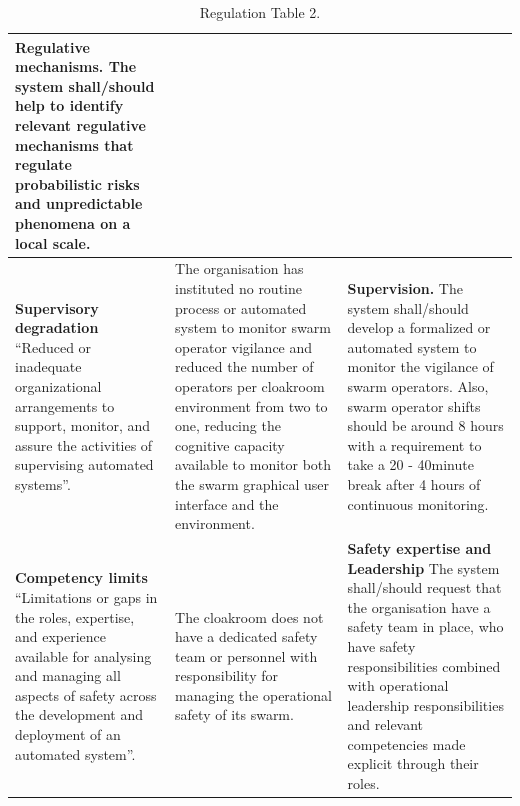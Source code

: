 \documentclass[lettersize,journal]{IEEEtran}
\begin{document}
\begin{landscape}
\begin{table}[]
\begin{tabular}{|p{0.3\textheight}|p{0.35\textheight}|p{0.35\textheight}|}
   \textbf{Regulative mechanisms.} The system shall/should help to identify relevant regulative mechanisms that regulate probabilistic risks and unpredictable phenomena on a local scale. \\
   \hline
   \textbf{Supervisory degradation} ``Reduced or inadequate organizational arrangements to support, monitor, and assure the activities of supervising automated systems”. \cite{macrae2021learning} & The organisation has instituted no routine process or automated system to monitor swarm operator vigilance and reduced the number of operators per cloakroom environment from two to one, reducing the cognitive capacity available to monitor both the swarm graphical user interface and the environment. &	\textbf{Supervision.} The system shall/should develop a formalized or automated system to monitor the vigilance of swarm operators. Also, swarm operator shifts should be around 8 hours with a requirement to take a 20 - 40minute break after 4 hours of continuous monitoring. \\
   \hline
   \textbf{Competency limits} ``Limitations or gaps in the roles, expertise, and experience available for analysing and managing all aspects of safety across the development and deployment of an automated system”. \cite{macrae2021learning} & The cloakroom does not have a dedicated safety team or personnel with responsibility for managing the operational safety of its swarm. & \textbf{Safety expertise and Leadership} The system shall/should request that the organisation have a safety team in place, who have safety responsibilities combined with operational leadership responsibilities and relevant competencies made explicit through their roles.\\
   \hline
    \end{tabular}
    \caption{Regulation Table 2.}
    \label{tab:reg_2}
\end{table}
\end{landscape}
\end{document}
